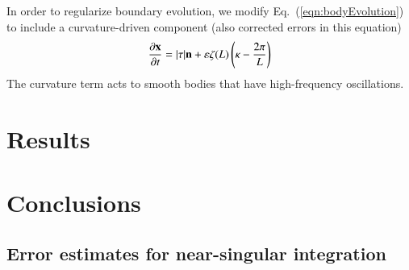 \documentclass[preprint, 10pt]{elsarticle}
\begin{document}


In order to regularize boundary evolution, we modify
Eq.~(\ref{eqn:bodyEvolution}) to include a curvature-driven component
(also corrected errors in this equation)
\begin{equation}
\frac{\partial {\mathbf{x}}}{\partial t} = |\tau| {\mathbf{n}} + \varepsilon \zeta(L) \left(\kappa - \frac{2 \pi}{L} \right)
\end{equation}
The curvature term acts to smooth bodies that have high-frequency oscillations.




\section{Results\label{s:results}} 

\section{Conclusions\label{s:conclusions}}


\begin{appendices}
\section{Error estimates for near-singular integration \label{A:AppendixA}} 
\end{appendices}


 

\end{document}

